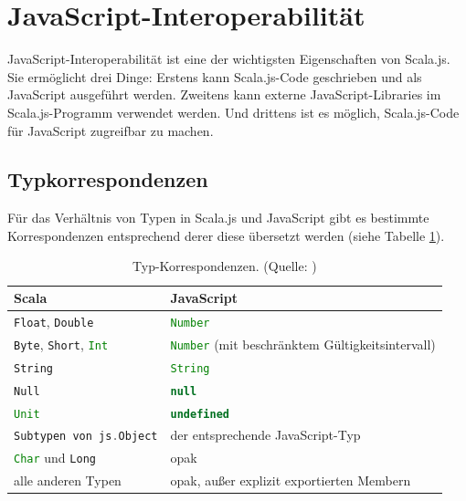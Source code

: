 \documentclass[a4paper, 12pt, hidelinks, listof=totoc, listoftables=totoc, bibliography=totoc]{scrreprt}
\newcommand{\scala}[1]{\lstinline[language=Scala, style=inline]|#1|}
\newcommand{\js}[1]{\lstinline[language=JavaScript, style=inline]|#1|}
\begin{document}
\section{JavaScript-Interoperabilität}

JavaScript-Interoperabilität ist eine der wichtigsten Eigenschaften von Scala.js. Sie ermöglicht drei Dinge: Erstens kann Scala.js-Code geschrieben und als JavaScript ausgeführt werden. Zweitens kann externe JavaScript-Libraries im Scala.js-Programm verwendet werden. Und drittens ist es möglich, Scala.js-Code für JavaScript zugreifbar zu machen.

\subsection{Typkorrespondenzen}

Für das Verhältnis von Typen in Scala.js und JavaScript gibt es bestimmte Korrespondenzen entsprechend derer diese übersetzt werden (siehe Tabelle \ref{table:type-correspondance}).

\medskip

\begin{table}[!h]
\begin{tabular}{|l|l|}
\hline \textbf{Scala}                           & \textbf{JavaScript} \\ 
\hline \scala{Float}, \scala{Double}            & \js{Number} \\ 
\hline \scala{Byte}, \scala{Short}, \scala{Int} & \js{Number} (mit beschränktem Gültigkeitsintervall) \\ 
\hline \scala{String}                           & \js{String} \\ 
\hline \scala{Null}                             & \js{null} \\ 
\hline \scala{Unit}                             & \js{undefined} \\ 
\hline \scala{Subtypen von js.Object}           & der entsprechende JavaScript-Typ \\ 
\hline \scala{Char} und \scala{Long}            & opak \\ 
\hline alle anderen Typen                       & opak, außer explizit exportierten Membern \\ 
\hline 
\end{tabular}
\caption{Typ-Korrespondenzen. (Quelle: \cite[S. 13]{doeraene2014.WHB})}
\label{table:type-correspondance}
\end{table}

\medskip
\end{document}
